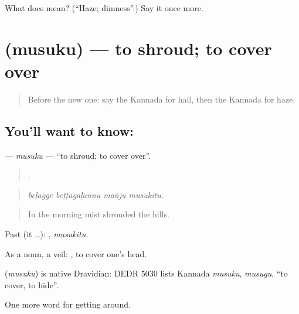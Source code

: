 \begin{tcolorbox}[breakable,colback=teal!4,colframe=teal!35!black,title={Before you move on}]
What does  mean? (\textquotedblleft{}Haze; dimness\textquotedblright{}.) Say it once more.
\end{tcolorbox}
\section[\texorpdfstring{\kn{ಮುಸುಕು} (musuku)}{ಮುಸುಕು (musuku)}]{ (musuku) — to shroud; to cover over}

\label{lesson:KA-C486-musuku}



\begin{quote}
Before the new one: say the Kannada for hail, then the Kannada for haze.
\end{quote}

\subsection*{You'll want to know: }
\textbf{} — \emph{musuku} — \textquotedblleft{}to shroud; to cover over\textquotedblright{}.

\begin{quote}
   .
\end{quote}

\begin{quote}
\emph{beḷagge beṭṭagaḷannu mañju musukitu.}
\end{quote}

\begin{quote}
In the morning mist shrouded the hills.
\end{quote}

Past (it …): , \emph{musukitu}.

As a noun, a veil:  , to cover one's head.

\begin{cousinweb}
\textbf{} (\emph{musuku}) is native Dravidian: DEDR 5030 lists Kannada \emph{musuku}, \emph{musugu}, \textquotedblleft{}to cover, to hide\textquotedblright{}.
\end{cousinweb}

\begin{grammarlens}[title={What you've built}]
One more word for getting around.
\end{grammarlens}

